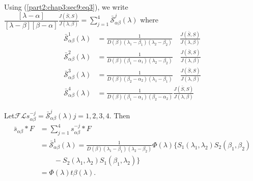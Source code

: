 Using (\ref{part2:chap3:sec9:eq3}), we write $\dfrac{[\lambda
    -\alpha]} {[\lambda-\beta] 
  [\beta -\alpha]} \frac{J (\bar{S},S)}{J (\lambda, \beta)} =
\sum\limits^4_{j=1} \bar{\mathscr{S}}^j_{\alpha \beta} (\lambda)$ 
where
\begin{align*}
      \bar{\mathscr{S}}^1_{\alpha \beta} (\lambda) &= \frac{1}{D
    (\beta) (\lambda_1 -\beta_1) (\lambda_2 - \beta_2)} \quad \frac{J
    (\bar{S},S)}{J (\lambda, \beta)}\\ 
 \bar{\mathscr{S}}^2_{\alpha \beta} (\lambda) &= \frac{1}{D (\beta)
    (\beta_1 -\alpha_1) (\lambda_2 - \beta_2)} \quad \frac{J
    (\bar{S},S)}{J (\lambda, \beta)}\\ 
  \bar{\mathscr{S}}^3_{\alpha \beta} (\lambda) & = \frac{1}{D (\beta)
    (\beta_2 -\alpha_2) (\lambda_1 - \beta_1)} \quad \frac{J
    (\bar{S},S)}{J (\lambda, \beta)}\\ 
  \bar{\mathscr{S}}^4_{\alpha \beta} (\lambda) &= \frac{1}{D (\beta)
    (\beta_1 -\alpha_1) (\beta_2 - \alpha_2)} \frac{J (\bar{S},S)}{J
    (\lambda, \beta)} 
\end{align*}

Let\pageoriginale $\mathscr{F} \mathcal{L} s^{-j}_{\alpha \beta}  =
\bar{\mathscr{S}}^j _{\alpha \beta} (\lambda) j=1,2,3,4$. Then  
\begin{align*}
  \bar{s}_{\alpha \beta} *F &= \sum\limits^4_{j=1} s^{-j}_{\alpha \beta} *F\\
  &= \bar{\mathscr{S}}^1_{\alpha \beta} (\lambda) = \frac{1}{D (\beta)
    (\lambda_1 -\beta_1) (\lambda_2 - \beta_2)} \Phi (\lambda) \big\{
  S_1 (\lambda_1,\lambda_2) S_2 (\beta_1,\beta_2) \\
  & \qquad -S_2
  (\lambda_1,\lambda_2) S_1 (\beta_1, \lambda_2)\big\}\\ 
  & = \Phi (\lambda) t \beta (\lambda).
\end{align*}

